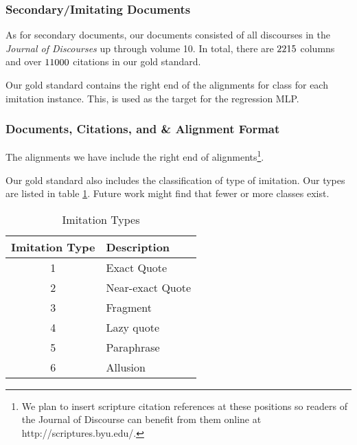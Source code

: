 \subsubsection{Secondary/Imitating Documents}
As for secondary documents, our documents consisted of all discourses in the \textit{Journal of Discourses} up through volume 10. In total, there are $2215$ columns and over $11000$ citations in our gold standard.

Our gold standard contains the right end of the alignments for class for each imitation instance. This, is used as the target for the regression MLP. %


\subsubsection{Documents, Citations, and \& Alignment Format}
The alignments we have include the right end of alignments\footnote{We plan to insert scripture citation references at these positions so readers of the Journal of Discourse can benefit from them online at http://scriptures.byu.edu/.}.

Our gold standard also includes the classification of type of imitation. Our types are listed in table \ref{tab:imitation-types}. Future work might find that fewer or more classes exist.

\begin{table}[center]
	\begin{center}
		\begin{tabular}{|c|l|} \hline
			\textbf{Imitation Type}	& \textbf{Description}		\\ \hline \hline
			1						& Exact Quote				\\ \hline
			2						& Near-exact Quote			\\ \hline
			3						& Fragment					\\ \hline
			4						& Lazy quote				\\ \hline
			5						& Paraphrase				\\ \hline
			6						& Allusion					\\ \hline
		\end{tabular}
	\end{center}
	
	\caption{Imitation Types}
	\label{tab:imitation-types}
\end{table}

